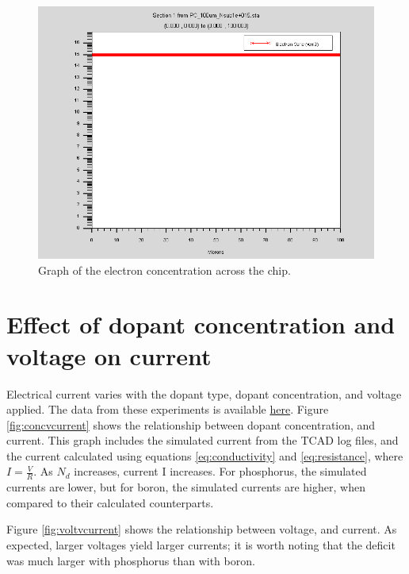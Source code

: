 \documentclass[12pt]{article}
\begin{document}
\begin{figure}[ht]
  \centering
  \includegraphics[width=\textwidth]{econc}
  \caption{Graph of the electron concentration across the chip.}
  \label{fig:econc}
\end{figure}

\section{Effect of dopant concentration and voltage on current}
Electrical current varies with the dopant type, dopant concentration, and voltage applied. The data from these experiments is available \href{https://docs.google.com/spreadsheets/d/1gYwgjLNNKRn5CSeJdrwOt3nx-jSYUwJLR_BUbzWCe9E/edit?usp=sharing}{here}. Figure \ref{fig:concvcurrent} shows the relationship between dopant concentration, and current. This graph includes the simulated current from the TCAD log files, and the current calculated using equations \eqref{eq:conductivity} and \eqref{eq:resistance}, where $I=\frac{V}{R}$. As $N_d$ increases, current {{I}} increases. For phosphorus, the simulated currents are lower, but for boron, the simulated currents are higher, when compared to their calculated counterparts.

Figure \ref{fig:voltvcurrent} shows the relationship between voltage, and current. As expected, larger voltages yield larger currents; it is worth noting that the deficit was much larger with phosphorus than with boron.
\end{document}
